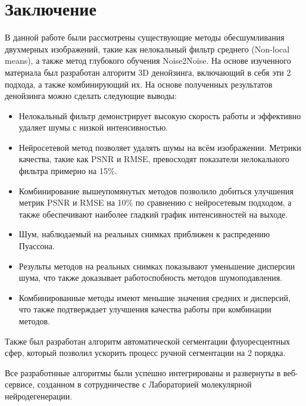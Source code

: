 \chapter*{Заключение} \label{ch-conclusion}
\par В данной работе были рассмотрены существующие методы обесшумливания двухмерных изображений, такие как нелокальный фильтр среднего (Non-local means), а также метод глубокого обучения Noise2Noise. На основе изученного материала был разработан алгоритм 3D денойзинга, включающий в себя эти 2 подхода, а также комбинирующий их. На основе полученных результатов денойзинга можно сделать следующие выводы:
\begin{itemize}[]
	\item Нелокальный фильтр демонстрирует высокую скорость работы и эффективно удаляет шумы с низкой интенсивностью.
	\item Нейросетевой метод позволяет удалять шумы на всём изображении. Метрики качества, такие как PSNR и RMSE, превосходят показатели нелокального фильтра примерно  на 15\%.
	\item Комбинирование вышеупомянутых методов позволило добиться улучшения метрик PSNR и RMSE на 10\% по сравнению с нейросетевым подходом, а также обеспечивают наиболее гладкий график интенсивностей на выходе.
	\item Шум, наблюдаемый на реальных снимках приближен к распредению Пуассона.
	\item Результы методов на реальных снимках показывают уменьшение дисперсии шума, что также доказывает работоспобность методов шумоподавления.
	\item Комбинированные методы имеют меньшие значения средних и дисперсий, что также подтверждает улучшения качества работы при комбинации методов.
\end{itemize}
\par Также был разработан алгоритм автоматической сегментации флуоресцентных сфер, который позволил ускорить процесс ручной сегментации на 2 порядка.
\par Все разработнные алгоритмы были успешно интегрированы и развернуты в веб-сервисе, созданном в сотрудничестве с Лабораторией молекулярной нейродегенерации. 